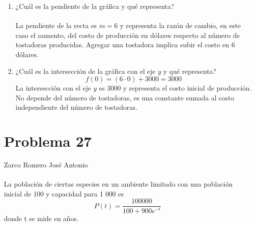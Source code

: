 \documentclass[12pt]{article}
\begin{document}
\begin{enumerate}
\item  ¿Cuál es la pendiente de la gráfica y qué representa?
\\ \\
La pendiente de la recta es $m=6$ y representa la razón de cambio, en este caso el aumento, del costo de producción en dólares respecto al número de tostadoras producidas. Agregar una tostadora implica subir el costo en 6 dólares.
\\  
\item  ¿Cuál es la intersección de la gráfica con el eje $y$ y qué representa?
\\
\[
f(0) = (6 \cdot 0) + 3000 = 3000
\]
La intersección con el eje $y$ es 3000 y representa el costo inicial de producción. No depende del número de tostadoras, es una constante sumada al costo independiente del número de tostadoras.
\\
\end{enumerate}

\section{Problema 27}
Zarco Romero José Antonio\\
\\
La población de ciertas especies en un ambiente limitado con una población inicial de 100 y capacidad para 1 000 es 
\[
P (t) = \frac{100 000}{100 + 900 e^{-t}} 
\]
donde t se mide en años.
\end{document}
